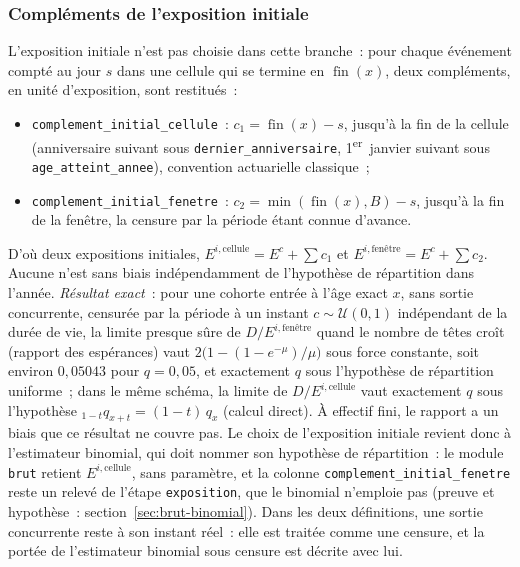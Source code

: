 \documentclass[a4paper,11pt]{article}
\newcommand{\code}[1]{\texttt{\small #1}}
\begin{document}
\subsubsection*{Compléments de l'exposition initiale}

L'exposition initiale n'est pas choisie dans cette branche~: pour chaque
événement compté au jour $s$ dans une cellule qui se termine en
$\operatorname{fin}(x)$, deux compléments, en unité d'exposition, sont
restitués~:

\begin{itemize}[leftmargin=*, itemsep=2pt]
  \item \code{complement\_initial\_cellule}~: $c_1 = \operatorname{fin}(x) - s$,
    jusqu'à la fin de la cellule (anniversaire suivant sous
    \code{dernier\_anniversaire}, 1\textsuperscript{er}~janvier suivant sous
    \code{age\_atteint\_annee}), convention actuarielle classique~;
  \item \code{complement\_initial\_fenetre}~: $c_2 = \min(\operatorname{fin}(x),
    B) - s$, jusqu'à la fin de la fenêtre, la censure par la période étant
    connue d'avance.
\end{itemize}

\noindent
D'où deux expositions initiales, $E^{i,\text{cellule}} = E^{c} + \sum c_1$ et
$E^{i,\text{fenêtre}} = E^{c} + \sum c_2$. Aucune n'est sans biais
indépendamment de l'hypothèse de répartition dans l'année. \emph{Résultat
exact}~: pour une cohorte entrée à l'âge exact $x$, sans sortie concurrente,
censurée par la période à un instant $c \sim \mathcal{U}(0, 1)$ indépendant de
la durée de vie, la limite presque sûre de $D/E^{i,\text{fenêtre}}$ quand le
nombre de têtes croît (rapport des espérances) vaut
$2\bigl(1 - (1 - e^{-\mu})/\mu\bigr)$ sous force constante, soit environ
$0{,}05043$ pour $q = 0{,}05$, et exactement $q$ sous l'hypothèse de
répartition uniforme~; dans le même schéma, la limite de
$D/E^{i,\text{cellule}}$ vaut exactement $q$ sous l'hypothèse
${}_{1-t}q_{x+t} = (1 - t)\,q_x$ (calcul direct). À effectif fini, le rapport a
un biais que ce résultat ne couvre pas. Le choix de l'exposition initiale
revient donc à l'estimateur binomial, qui doit nommer son hypothèse de
répartition~: le module \code{brut} retient $E^{i,\text{cellule}}$, sans
paramètre, et la colonne \code{complement\_initial\_fenetre} reste un relevé
de l'étape \code{exposition}, que le binomial n'emploie pas (preuve et
hypothèse~: section~\ref{sec:brut-binomial}). Dans les deux définitions, une
sortie concurrente reste à son instant réel~: elle est traitée comme une
censure, et la portée de l'estimateur binomial sous censure est décrite avec
lui.
\end{document}
